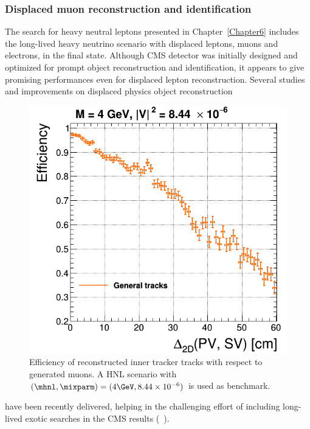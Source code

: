 \subsubsection{Displaced muon
  reconstruction and identification}\label{sec:c2muondisplaced}
The search for heavy neutral leptons presented in
Chapter~\ref{Chapter6} includes the long-lived heavy
 neutrino scenario with
displaced leptons, muons and electrons, in the final
state. Although CMS detector was initially designed and optimized for prompt
object reconstruction and identification, it appears to give
promising performances even for displaced lepton
reconstruction. Several studies and improvements on displaced physics object
reconstruction
\begin{figure}
\centering
\includegraphics[width=.40\textwidth]{Figures/c6/object/tracking_M-4_V-0p00290516780927_rho.png}
  \caption{Efficiency of reconstructed inner tracker tracks with
    respect to generated muons. A HNL scenario with
    $(\mhnl,\mixparm)=(4\GeV,8.44\times10^{-6})$ is used as
    benchmark. \dani}
  \label{fig:c2tracking}
\end{figure}
 have been recently
delivered, helping in the challenging effort of including long-lived
exotic searches in the CMS results (~\cite{cmscollaboration2021search, Sirunyan_2019ll,
  Sirunyan_2019ll2, Sirunyan_2020ll, Sirunyan_2021ll,CMS:2021tkn}).\\

